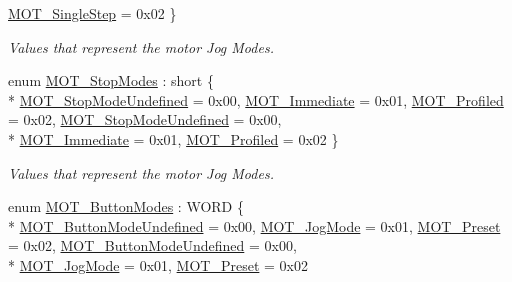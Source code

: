 \begin{DoxyCompactItemize}
\hyperlink{group___common_gga009eac484778f2873f249c8562d94a93a48cd563aa46a46ac784f7b13be3be86c}{M\+O\+T\+\_\+\+Single\+Step} = 0x02
 \}\begin{DoxyCompactList}\small\item\em Values that represent the motor Jog Modes. \end{DoxyCompactList}
\item 
enum \hyperlink{group___common_ga4b1f06d8365231862a18380e278c3c44}{M\+O\+T\+\_\+\+Stop\+Modes} \+: short \{ \\*
\hyperlink{group___common_gga4b1f06d8365231862a18380e278c3c44ae86cc830a5ce5688dc85d33fb72141e6}{M\+O\+T\+\_\+\+Stop\+Mode\+Undefined} = 0x00, 
\hyperlink{group___common_gga4b1f06d8365231862a18380e278c3c44a545150bdde54a8f8ea55039c71b01033}{M\+O\+T\+\_\+\+Immediate} = 0x01, 
\hyperlink{group___common_gga4b1f06d8365231862a18380e278c3c44a5582c0ca48da63a0de82e2403415ddf3}{M\+O\+T\+\_\+\+Profiled} = 0x02, 
\hyperlink{group___common_gga4b1f06d8365231862a18380e278c3c44ae86cc830a5ce5688dc85d33fb72141e6}{M\+O\+T\+\_\+\+Stop\+Mode\+Undefined} = 0x00, 
\\*
\hyperlink{group___common_gga4b1f06d8365231862a18380e278c3c44a545150bdde54a8f8ea55039c71b01033}{M\+O\+T\+\_\+\+Immediate} = 0x01, 
\hyperlink{group___common_gga4b1f06d8365231862a18380e278c3c44a5582c0ca48da63a0de82e2403415ddf3}{M\+O\+T\+\_\+\+Profiled} = 0x02
 \}\begin{DoxyCompactList}\small\item\em Values that represent the motor Jog Modes. \end{DoxyCompactList}
\item 
enum \hyperlink{group___common_ga7cccb4c592f8aa2f869b5cd9f0b0e7f9}{M\+O\+T\+\_\+\+Button\+Modes} \+: W\+O\+RD \{ \\*
\hyperlink{group___common_gga7cccb4c592f8aa2f869b5cd9f0b0e7f9a31e6b371600db08005cbf355d41e7f03}{M\+O\+T\+\_\+\+Button\+Mode\+Undefined} = 0x00, 
\hyperlink{group___common_gga7cccb4c592f8aa2f869b5cd9f0b0e7f9ab71d573463b20821e5b42cf523c512be}{M\+O\+T\+\_\+\+Jog\+Mode} = 0x01, 
\hyperlink{group___common_gga7cccb4c592f8aa2f869b5cd9f0b0e7f9ac7c903649c2421d63f2def21b0fe2043}{M\+O\+T\+\_\+\+Preset} = 0x02, 
\hyperlink{group___common_gga7cccb4c592f8aa2f869b5cd9f0b0e7f9a31e6b371600db08005cbf355d41e7f03}{M\+O\+T\+\_\+\+Button\+Mode\+Undefined} = 0x00, 
\\*
\hyperlink{group___common_gga7cccb4c592f8aa2f869b5cd9f0b0e7f9ab71d573463b20821e5b42cf523c512be}{M\+O\+T\+\_\+\+Jog\+Mode} = 0x01, 
\hyperlink{group___common_gga7cccb4c592f8aa2f869b5cd9f0b0e7f9ac7c903649c2421d63f2def21b0fe2043}{M\+O\+T\+\_\+\+Preset} = 0x02

\end{DoxyCompactItemize}
